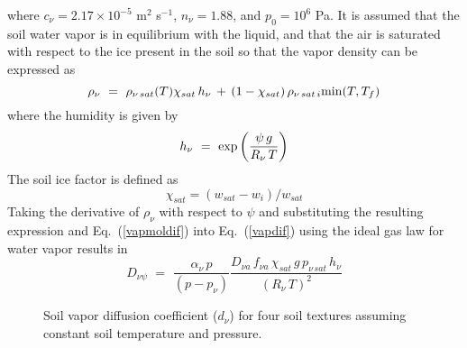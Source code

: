 %
%
where $c_\nu = 2.17 \times {10}^{-5}$ m$^2$ s$^{-1}$,
$n_\nu = 1.88$, and $p_0 = {10}^6$ Pa. It is assumed that the soil
water vapor is in equilibrium with the liquid, and that
the air is saturated with respect to the 
ice present in the soil
so that the vapor density can be expressed as
%
%
\begin{equation}
\label{vapden}
\rho_\nu \,\,=\,\,
\rho_{\nu\,sat}(T)
\chi_{sat} \, h_\nu
\,+\,
\left( 1-\chi_{sat}\right) \rho_{\nu\,sat\,i}{\rm min}(T,T_f)
\end{equation}
%
%
where the humidity is given by
%
%
\begin{equation}
\label{vaphum}
h_\nu \,\,=\,\,
{\rm exp}\left( \frac{\psi\,g}{ R_\nu \,T}\right)
\end{equation}
%
%
The soil ice factor is defined as
%
\begin{equation}
\label{chisat}
\chi_{sat} = \left(w_{sat}-w_i\right)/w_{sat}
\end{equation}
%
% 
Taking the derivative of $\rho_\nu$ with respect to $\psi$
and substituting the resulting expression and
Eq.~(\ref{vapmoldif}) into Eq.~(\ref{vapdif}) 
using the ideal gas law for water
vapor results in
%
%
\begin{equation}
\label{vapdif2}
D_{\nu\psi} \,\,=\,\,
\frac{\alpha_\nu \,p }{ \left( p-p_\nu\right)}
\frac{D_{\nu a}\,f_{\nu a}\,\chi_{sat} \,g \, p_{\nu\,sat} \,h_\nu
}{ {\left(R_\nu \,T\right)}^2}
\end{equation}
%

\begin{figure}[h]
		 \begin{center}
		 \caption{Soil vapor diffusion coefficient ($d_\nu$) for four soil
textures assuming constant soil temperature
and pressure.}
		 \label{vapdiffig}
		 \end{center}
\end{figure}

